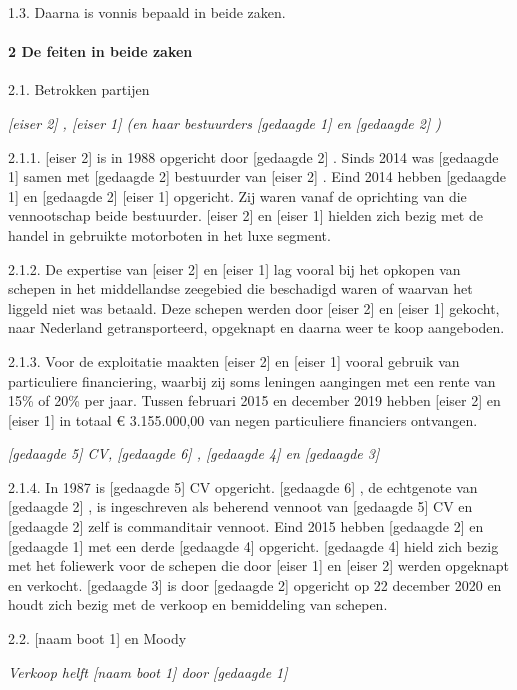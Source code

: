 \documentclass[
  dutch,
  a4paper,
]{article}
\begin{document}
1.3. Daarna is vonnis bepaald in beide zaken.

\paragraph{2 De feiten in beide zaken}\label{de-feiten-in-beide-zaken}

2.1. Betrokken partijen

\emph{{[}eiser 2{]} , {[}eiser 1{]} (en haar bestuurders {[}gedaagde 1{]} en {[}gedaagde 2{]} )}

2.1.1. {[}eiser 2{]} is in 1988 opgericht door {[}gedaagde 2{]} . Sinds 2014 was {[}gedaagde 1{]} samen met {[}gedaagde 2{]} bestuurder van {[}eiser 2{]} . Eind 2014 hebben {[}gedaagde 1{]} en {[}gedaagde 2{]} {[}eiser 1{]} opgericht. Zij waren vanaf de oprichting van die vennootschap beide bestuurder. {[}eiser 2{]} en {[}eiser 1{]} hielden zich bezig met de handel in gebruikte motorboten in het luxe segment.

2.1.2. De expertise van {[}eiser 2{]} en {[}eiser 1{]} lag vooral bij het opkopen van schepen in het middellandse zeegebied die beschadigd waren of waarvan het liggeld niet was betaald. Deze schepen werden door {[}eiser 2{]} en {[}eiser 1{]} gekocht, naar Nederland getransporteerd, opgeknapt en daarna weer te koop aangeboden.

2.1.3. Voor de exploitatie maakten {[}eiser 2{]} en {[}eiser 1{]} vooral gebruik van particuliere financiering, waarbij zij soms leningen aangingen met een rente van 15\% of 20\% per jaar. Tussen februari 2015 en december 2019 hebben {[}eiser 2{]} en {[}eiser 1{]} in totaal € 3.155.000,00 van negen particuliere financiers ontvangen.

\emph{{[}gedaagde 5{]} CV, {[}gedaagde 6{]} , {[}gedaagde 4{]} en {[}gedaagde 3{]}}

2.1.4. In 1987 is {[}gedaagde 5{]} CV opgericht. {[}gedaagde 6{]} , de echtgenote van {[}gedaagde 2{]} , is ingeschreven als beherend vennoot van {[}gedaagde 5{]} CV en {[}gedaagde 2{]} zelf is commanditair vennoot. Eind 2015 hebben {[}gedaagde 2{]} en {[}gedaagde 1{]} met een derde {[}gedaagde 4{]} opgericht. {[}gedaagde 4{]} hield zich bezig met het foliewerk voor de schepen die door {[}eiser 1{]} en {[}eiser 2{]} werden opgeknapt en verkocht. {[}gedaagde 3{]} is door {[}gedaagde 2{]} opgericht op 22 december 2020 en houdt zich bezig met de verkoop en bemiddeling van schepen.

2.2. {[}naam boot 1{]} en Moody

\emph{Verkoop helft {[}naam boot 1{]} door {[}gedaagde 1{]}}
\end{document}
